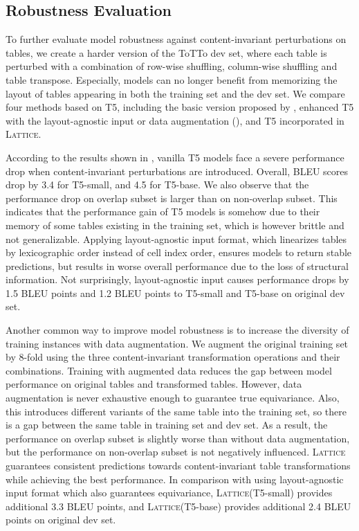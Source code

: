\documentclass[11pt]{article}
\newcommand{\model}{\mbox{\textsc{Lattice}}\xspace}
\begin{document}
\subsection{Robustness Evaluation} 
\label{sec/exp/robust}
To further evaluate model robustness against content-invariant perturbations on tables, we create a harder version of the ToTTo dev set, where each table is perturbed with a combination of row-wise shuffling, column-wise shuffling and table transpose.
Especially, models can no longer benefit from memorizing the layout of tables appearing in both the training set and the dev set.
We compare four methods based on T5, including the basic version proposed by \citet{kale2020text}, enhanced T5 with the layout-agnostic input or data augmentation (), and T5 incorporated in \model.

According to the results shown in
,
vanilla T5 models face a severe performance drop when content-invariant perturbations are introduced.
Overall, BLEU scores drop by 3.4 for T5-small, and 4.5 for T5-base.
We also observe that the performance drop on overlap subset is larger than on non-overlap subset.
This indicates that the performance gain of T5 models is somehow due to their memory of some tables existing in the training set, which is however brittle and not generalizable.
Applying layout-agnostic input format, which linearizes tables by lexicographic order instead of cell index order, ensures models to return stable predictions, but results in worse overall performance due to the loss of structural information.
Not surprisingly, layout-agnostic input causes performance drops by 1.5 BLEU points and 1.2 BLEU points to T5-small and T5-base on original dev set.

Another common way to improve model robustness is to increase the diversity of training instances with data augmentation.
We augment the original training set by 8-fold using the three content-invariant transformation operations and their combinations. Training with augmented data reduces the gap between model performance on original tables and transformed tables.
However, data augmentation is never exhaustive enough to guarantee true equivariance.
Also, this introduces different variants of the same table into the training set, so there is a gap between the same table in training set and dev set. 
As a result, the performance on overlap subset is slightly worse than without data augmentation, but the performance on non-overlap subset is not negatively influenced.
\model guarantees consistent predictions towards content-invariant table transformations while achieving the best performance.
In comparison with using layout-agnostic input format which also guarantees equivariance, \model (T5-small) provides additional 3.3 BLEU points, and \model (T5-base) provides additional 2.4 BLEU points on original dev set.
\end{document}
